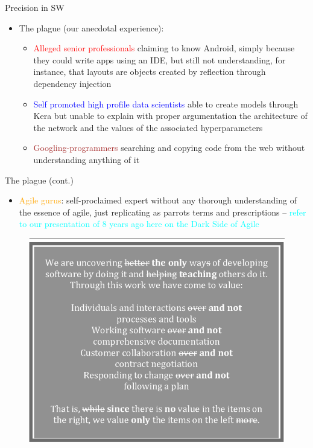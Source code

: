 \documentclass{beamer}
\begin{document}
\begin{frame}
{\centerline{Precision in SW}}
\begin{itemize}
\item The plague (our anecdotal experience):
\begin{itemize}
	\item \textcolor{red}{Alleged senior professionals} claiming to know Android, simply because they could write apps using an IDE, but still not understanding, for instance, that layouts are objects created by reflection through dependency injection
	\item \textcolor{blue}{Self promoted high profile data scientists} able to create models through Kera but unable to explain with proper argumentation the architecture of the network and the values of the associated hyperparameters
	\item \textcolor{brown}{Googling-programmers} searching and copying code from the web without understanding anything of it
\end{itemize}
\end{itemize}

\end{frame}

\begin{frame}
{\centerline{The plague (cont.) }}
\begin{itemize}
	\item \textcolor{orange}{Agile gurus}: self-proclaimed expert  without any thorough understanding of the essence of agile, just replicating as parrots terms and prescriptions -- \textcolor{cyan}{refer to our presentation of 8 years ago here on the Dark Side of Agile}
\end{itemize}
\begin{figure}[htp]
    \centering
     \includegraphics[width=.55\textwidth]{P2023.AIBCCSS.StoryTelling/TheDarkAgileManifesto.png}
    \label{F:TheDarkAgileManifesto}
\end{figure}

\end{frame}
\end{document}
